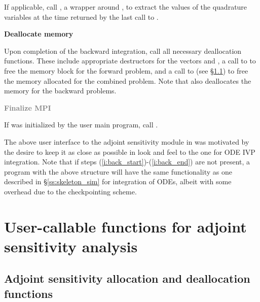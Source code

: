 \begin{Steps}
  If applicable, call , a wrapper around ,
  to extract the values of the quadrature variables at the time returned
  by the last call to .

\item
  {\bf Deallocate memory}

  Upon completion of the backward integration, call all necessary deallocation
  functions. These include appropriate destructors for the vectors 
   and , a call to  to free the {\cvodes} memory block 
  for the forward problem, and a call to  (see \S\ref{sss:cvadjinit}) to free 
  the memory allocated for the combined problem. 
  Note that  also deallocates the {\cvodes} memory for the backward problems.

\item
  \textcolor{gray}{\bf Finalize MPI}

  {\p} If {\mpi} was initialized by the user main program, call .

\end{Steps}

The above user interface to the adjoint sensitivity module in {\cvodes} was motivated by
the desire to keep it as close as possible in look and feel to the one for ODE IVP 
integration. Note that if steps (\ref{i:back_start})-(\ref{i:back_end}) are not present, 
a program with the above structure will have the same functionality as one described in
\S\ref{ss:skeleton_sim} for integration of ODEs, albeit with some overhead due to 
the checkpointing scheme.

\section{User-callable functions for adjoint sensitivity analysis}

\subsection{Adjoint sensitivity allocation and deallocation functions}
\label{sss:cvadjinit}

